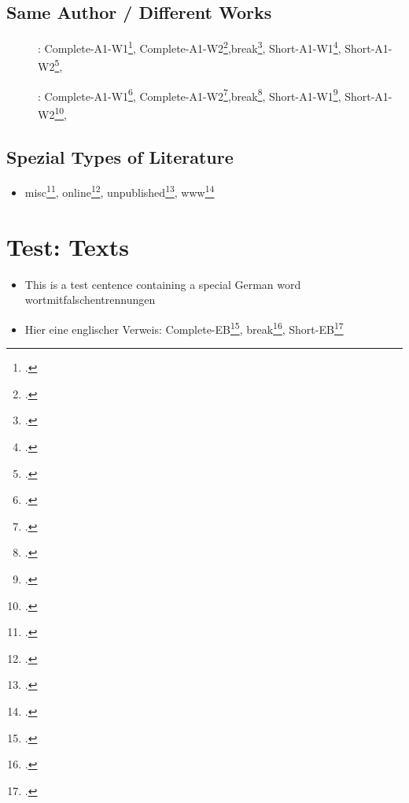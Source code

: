 \documentclass[
  DIV=calc,
  BCOR=5mm,
  11pt,
  headings=small,
  oneside,
  abstract=true,
  toc=bib,
  ngerman,english]{scrartcl}
\begin{document}
\subsection{Same Author / Different Works}
\begin{description}
  \item[\mars]: Complete-A1-W1\footcite[cf.][15]{S12020a}, Complete-A1-W2\footcite[cf.][15]{S22020a},break\footcite[cf.][15]{BR2020a}, Short-A1-W1\footcite[cf.][15]{S12020a}, Short-A1-W2\footcite[cf.][15]{S22020a},
  \item[\female\female]: Complete-A1-W1\footcite[cf.][15]{S32020a}, Complete-A1-W2\footcite[cf.][15]{S42020a},break\footcite[cf.][15]{BR2020a}, Short-A1-W1\footcite[cf.][15]{S32020a}, Short-A1-W2\footcite[cf.][15]{S42020a},
\end{description}

\subsection{Spezial Types of Literature}
\begin{itemize}
  \item misc\footcite[cf.][15]{M12020a}, online\footcite[cf.][15]{O12020a}, unpublished\footcite[cf.][15]{UP12020a}, www\footcite[cf.][15]{W12020a}
\end{itemize}


\section{Test: Texts}

\begin{itemize}
  \item This is a test centence containing a special German word wortmitfalschentrennungen
  \item Hier eine englischer Verweis: Complete-EB\footcite[cf.][15]{L12020a}, break\footcite[cf.][15]{BR2020a}, Short-EB\footcite[cf.][15]{L12020a}
\end{itemize}



\printnomenclature
\printbibliography
\end{document}
